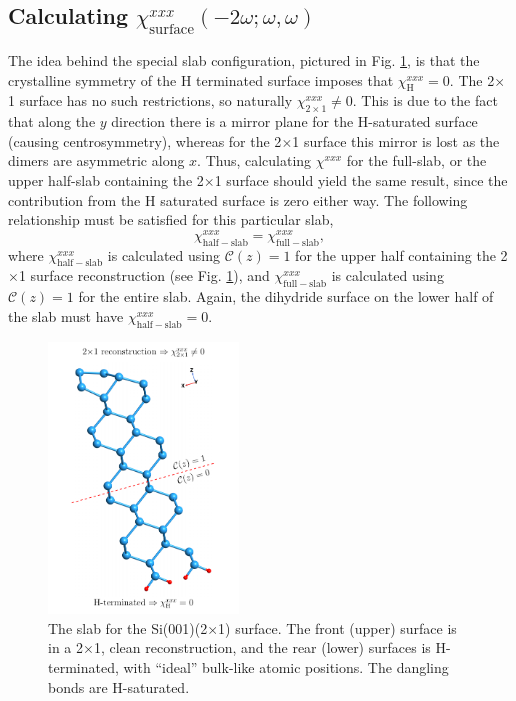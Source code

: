 
\subsection{Calculating 
\texorpdfstring{$\chi^{xxx}_{\mathrm{surface}}(-2\omega;\omega,\omega)$}{Xxxx}}
\label{sec:res2x1chi}

The idea behind the special slab configuration, pictured in Fig.
\ref{fig:si2x1slab}, is that the crystalline symmetry of the H terminated
surface imposes that $\chi_{\mathrm{H}}^{xxx}=0$. The 2$\times$1 surface has no
such restrictions, so naturally $\chi_{2\times 1}^{xxx}\ne 0$. This is due to
the fact that along the $y$ direction there is a mirror plane for the
H-saturated surface (causing centrosymmetry), whereas for the 2$\times$1 surface
this mirror is lost as the dimers are asymmetric along $x$. Thus, calculating
$\chi^{xxx}$ for the full-slab, or the upper half-slab containing the 2$\times$1
surface \cite{note1} should yield the same result, since the contribution from
the H saturated surface is zero either way. The following relationship must be
satisfied for this particular slab,
\begin{equation*}
\chi_{\mathrm{half-slab}}^{xxx} =
\chi_{\mathrm{full-slab}}^{xxx},
\end{equation*}
where $\chi_{\mathrm{half-slab}}^{xxx}$ is calculated using
${\mathbf{\mathcal{C}}}(z) = 1$ for the upper half containing the 2$\times$1
surface reconstruction (see Fig. \ref{fig:si2x1slab}), and
$\chi_{\mathrm{full-slab}}^{xxx}$ is calculated using ${\mathbf{\mathcal{C}}}(z)
= 1$ for the entire slab. Again, the dihydride surface on the lower half of the
slab must have $\chi_{\mathrm{half-slab}}^{xxx} = 0$.

\begin{figure}[t]
\centering 
\includegraphics[width=0.45\textwidth]{content/figures/struc-Si2x1-rot}
\caption{The slab for the Si(001)(2$\times$1) surface. The front (upper) surface
is in a 2$\times$1, clean reconstruction, and the rear (lower) surfaces is
H-terminated, with ``ideal'' bulk-like atomic positions. The dangling bonds are
H-saturated.}
\label{fig:si2x1slab}
\end{figure} 


